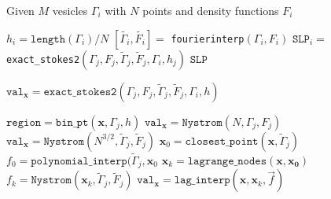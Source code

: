\documentclass[12pt]{article}
\begin{document}
\begin{algorithm}
  \caption{Given $M$ vesicles $\Gamma_{i}$ with $N$ points and density functions $F_{i}$}
  \begin{algorithmic}
    \STATE $h_{i} = \mathtt{length}(\Gamma_{i})/N$
    \STATE $[\widetilde{\Gamma_i},\tilde{F_{i}}] =$ \texttt{fourierinterp}$(\Gamma_{i},F_{i})$
    \ENDFOR
    \STATE $\mathtt{SLP} _{i}=$ \texttt{exact\_stokes2}$(\Gamma_{j},F_{j},
    \widetilde{\Gamma}_{j},\widetilde{F}_{j},\Gamma_{i},h_{j})$
    \ENDIF
    \ENDFOR
    \ENDFOR
    \STATE
    \RETURN $\mathtt{SLP}$
  \end{algorithmic}
\end{algorithm}



\begin{algorithm}
  \caption{$\mathtt{val}_{\mathbf{x}} = \mathtt{exact\_stokes2}(\Gamma_{j},F_{j},
    \widetilde{\Gamma}_{j},\widetilde{F}_{j},\Gamma_{i},h)$}
  \begin{algorithmic}
    \STATE $\mathtt{region} = \mathtt{bin\_pt}(\mathbf{x},\Gamma_{j},h)$
    \STATE $\mathtt{val}_{\mathbf{x}} = \mathtt{Nystrom}(N,\Gamma_{j},F_{j})$
    \STATE $\mathtt{val}_{\mathbf{x}} =\mathtt{Nystrom}(N^{3/2},\widetilde{\Gamma}_{j},\widetilde{F}_{j})$
    \ELSE
    \STATE $\mathbf{x}_{0} = \mathtt{closest\_point}(\mathbf{x},\widetilde{\Gamma}_{j})$
    \STATE $f_{0} = \mathtt{polynomial\_interp}(\widetilde{\Gamma}_{j},\mathbf{x}_{0}$
    \STATE $\mathbf{x}_{k} = \mathtt{lagrange\_nodes}(\mathbf{x},\mathbf{x_{0}})$
    \STATE $f_{k} = \mathtt{Nystrom}(\mathbf{x}_{k},\widetilde{\Gamma}_{j},\widetilde{F}_{j})$
    \ENDFOR
    \STATE $\mathtt{val}_{\mathbf{x}} = \mathtt{lag\_interp}(\mathbf{x},\mathbf{x}_{k},\vec{f})$
    \ENDIF
    \ENDFOR
  \end{algorithmic}

\end{algorithm}
\end{document}
